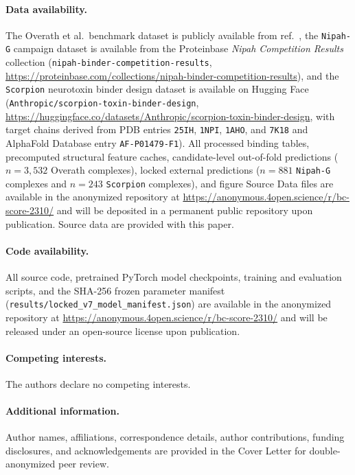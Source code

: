\documentclass[10pt,twocolumn]{article}
\begin{document}
\paragraph{Data availability.}
The Overath et al.\ benchmark dataset is publicly available from ref.~\cite{overath2025predicting}, the \texttt{Nipah-G} campaign dataset is available from the Proteinbase \textit{Nipah Competition Results} collection (\texttt{nipah-binder-competition-results}, \url{https://proteinbase.com/collections/nipah-binder-competition-results}), and the \texttt{Scorpion} neurotoxin binder design dataset is available on Hugging Face (\texttt{Anthropic/scorpion-toxin-binder-design}, \url{https://huggingface.co/datasets/Anthropic/scorpion-toxin-binder-design}, with target chains derived from PDB entries \texttt{25IH}, \texttt{1NPI}, \texttt{1AHO}, and \texttt{7K18} and AlphaFold Database entry \texttt{AF-P01479-F1}). All processed binding tables, precomputed structural feature caches, candidate-level out-of-fold predictions ($n = 3,532$ Overath complexes), locked external predictions ($n = 881$ \texttt{Nipah-G} complexes and $n = 243$ \texttt{Scorpion} complexes), and figure Source Data files are available in the anonymized repository at \url{https://anonymous.4open.science/r/bc-score-2310/} and will be deposited in a permanent public repository upon publication. Source data are provided with this paper.

\paragraph{Code availability.}
All source code, pretrained PyTorch model checkpoints, training and evaluation scripts, and the SHA-256 frozen parameter manifest (\texttt{results/locked\_v7\_model\_manifest.json}) are available in the anonymized repository at \url{https://anonymous.4open.science/r/bc-score-2310/} and will be released under an open-source license upon publication.

\paragraph{Competing interests.}
The authors declare no competing interests.

\paragraph{Additional information.}
Author names, affiliations, correspondence details, author contributions, funding disclosures, and acknowledgements are provided in the Cover Letter for double-anonymized peer review.
\end{document}

